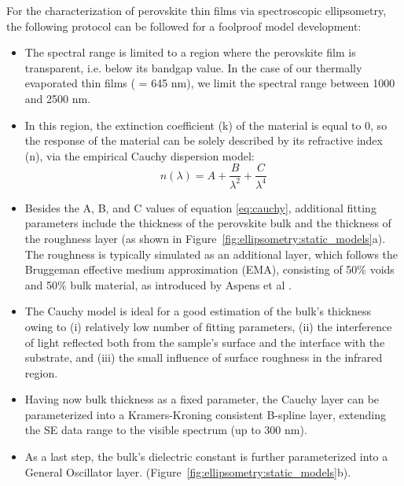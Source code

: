 For the characterization of perovskite thin films via spectroscopic ellipsometry, the following protocol can be followed for a foolproof model development: 
\begin{itemize}
    \item The spectral range is limited to a region where the perovskite film is transparent, i.e. below its bandgap value. In the case of our thermally evaporated  thin films ( = 645 nm), we limit the spectral range between 1000 and 2500 nm. 
    \item In this region, the extinction coefficient (k) of the material is equal to 0, so the response of the material can be solely described by its refractive index (n), via the empirical Cauchy dispersion model:
        \begin{equation}
            n(\lambda) = A + \frac{B}{\lambda^2} + \frac{C}{\lambda^4}
            \label{eq:cauchy}
        \end{equation}
    \item Besides the A, B, and C values of equation \ref{eq:cauchy}, additional fitting parameters include the thickness of the perovskite bulk and the thickness of the roughness layer (as shown in Figure~\ref{fig:ellipsometry:static_models}a). The roughness is typically simulated as an additional layer, which follows the Bruggeman effective medium approximation (EMA), consisting of 50\% voids and 50\% bulk material, as introduced by Aspens et al \cite{Aspnes1979InvestigationEllipsometry}. 

    \item The Cauchy model is ideal for a good estimation of the bulk's thickness owing to (i) relatively low number of fitting parameters, (ii) the interference of light reflected both from the sample's surface and the interface with the substrate, and (iii) the small influence of surface roughness in the infrared region.

    \item Having now bulk thickness as a fixed parameter, the Cauchy layer can be parameterized into a Kramers-Kroning consistent B-spline layer, extending the SE data range to the visible spectrum (up to 300 nm). 

    \item As a last step, the bulk's dielectric constant is further parameterized into a General Oscillator layer. (Figure~\ref{fig:ellipsometry:static_models}b).    

\end{itemize}

